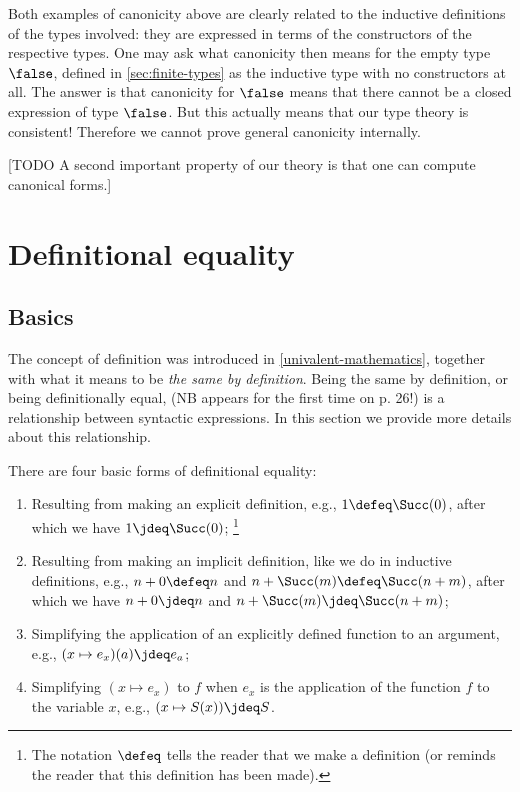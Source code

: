 Both examples of canonicity above are clearly related to the
inductive definitions of the types involved: they are
expressed in terms of the constructors of the respective types.
One may ask what canonicity then means for the empty type $\false$,
defined in \cref{sec:finite-types} as the inductive type
with no constructors at all. The answer is that canonicity for $\false$
means that there cannot be a closed expression of type $\false$.
But this actually means that our type theory is consistent!
Therefore we cannot prove general canonicity internally.


[TODO A second important property of our theory is 
that one can compute canonical forms.]

\section{Definitional equality}
\label{sec:defeq}

\subsection{Basics}
\label{sec:defeq-basics}

The concept of definition was introduced in \cref{univalent-mathematics},
together with what it means to be \emph{the same by definition}. 
Being the same by definition, or being definitionally equal, 
(NB appears for the first time on p. 26!) 
is a relationship between syntactic expressions.
In this section we provide more details about this relationship.

There are four basic forms of definitional equality:
\begin{enumerate}
\item\label{it:exp-defeq} Resulting from making an explicit definition, 
e.g., $1 \defeq \Succ(0)$, after which we have $1 \jdeq \Succ(0)$;%
\footnote{The notation $\defeq$ tells the reader that we make a definition
(or reminds the reader that this definition has been made).}

\item\label{it:imp-defeq} Resulting from making an implicit definition, 
like we do in inductive definitions,
e.g., $n+0 \defeq n$ and $n+\Succ(m) \defeq \Succ(n+m)$,
after which we have $n+0 \jdeq n$ and $n+\Succ(m) \jdeq \Succ(n+m)$;

\item\label{it:beta} Simplifying the application of an explicitly defined 
function to an argument, e.g., $(x \mapsto e_x)(a) \jdeq e_a$;

\item\label{it:eta} Simplifying $(x \mapsto e_x)$ to $f$ when $e_x$
is the application of the function $f$ to the variable $x$,
e.g., $(x \mapsto S(x)) \jdeq S$.
\end{enumerate}

